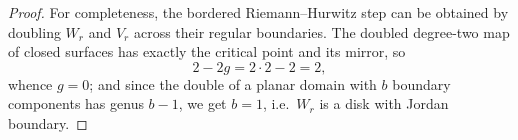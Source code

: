\begin{proof}
For completeness, the bordered Riemann--Hurwitz step can be obtained by doubling \(W_r\) and \(V_r\) across their regular boundaries.  The doubled degree-two map of closed surfaces has exactly the critical point and its mirror, so
\[
 2-2g=2\cdot2-2=2,
\]
whence \(g=0\); and since the double of a planar domain with \(b\) boundary components has genus \(b-1\), we get \(b=1\), i.e.\ \(W_r\) is a disk with Jordan boundary.
\end{proof}